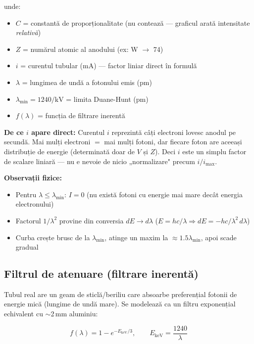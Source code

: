 \documentclass[12pt,a4paper]{article}
\begin{document}
\noindent unde:
\begin{itemize}[leftmargin=2em]
    \item $C$ = constantă de proporționalitate (nu contează — graficul arată intensitate \emph{relativă})
    \item $Z$ = numărul atomic al anodului (ex: W $\rightarrow$ 74)
    \item $i$ = curentul tubular (mA) — factor liniar direct în formulă
    \item $\lambda$ = lungimea de undă a fotonului emis (pm)
    \item $\lambda_{\min} = 1240/\text{kV}$ = limita Duane-Hunt (pm)
    \item $f(\lambda)$ = funcția de filtrare inerentă
\end{itemize}

\textbf{De ce $i$ apare direct:} Curentul $i$ reprezintă câți electroni lovesc anodul pe secundă. Mai mulți electroni $=$ mai mulți fotoni, dar fiecare foton are aceeași distribuție de energie (determinată doar de $V$ și $Z$). Deci $i$ este un simplu factor de scalare liniară — nu e nevoie de nicio „normalizare" precum $i/i_{\max}$.

\textbf{Observații fizice:}
\begin{itemize}[leftmargin=2em]
    \item Pentru $\lambda \leq \lambda_{\min}$: $I = 0$ (nu există fotoni cu energie mai mare decât energia electronului)
    \item Factorul $1/\lambda^2$ provine din conversia $dE \to d\lambda$ ($E = hc/\lambda \Rightarrow dE = -hc/\lambda^2 \, d\lambda$)
    \item Curba crește brusc de la $\lambda_{\min}$, atinge un maxim la $\approx 1.5\lambda_{\min}$, apoi scade gradual
\end{itemize}

\subsection{Filtrul de atenuare (filtrare inerentă)}

Tubul real are un geam de sticlă/beriliu care absoarbe preferențial fotonii de energie mică (lungime de undă mare). Se modelează ca un filtru exponențial echivalent cu $\sim$2\,mm aluminiu:

\begin{equation}
    f(\lambda) = 1 - e^{-E_{\text{keV}} / 3}, \qquad E_{\text{keV}} = \frac{1240}{\lambda}
\end{equation}
\end{document}
